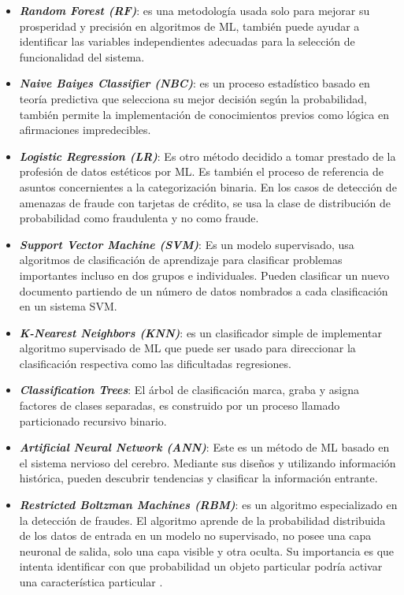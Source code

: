   \begin{itemize}
  	\item \textit{\textbf{Random Forest (RF)}}: es una metodolog\'{i}a usada solo para mejorar su prosperidad y precisi\'{o}n en algoritmos de ML, tambi\'{e}n puede ayudar a identificar las variables independientes adecuadas para la selecci\'{o}n de funcionalidad del sistema.
  	\item \textit{\textbf{Naive Baiyes Classifier (NBC)}}: es un proceso estad\'{i}stico basado en teor\'{i}a predictiva que selecciona su mejor decisi\'{o}n seg\'{u}n la probabilidad, tambi\'{e}n permite la implementaci\'{o}n de conocimientos previos como l\'{o}gica en afirmaciones impredecibles.
  	\item \textit{\textbf{Logistic Regression (LR)}}: Es otro m\'{e}todo decidido a tomar prestado de la profesi\'{o}n de datos est\'{e}ticos por ML. Es tambi\'{e}n el proceso de referencia de asuntos concernientes a la categorizaci\'{o}n binaria. En los casos de detecci\'{o}n de amenazas de fraude con tarjetas de cr\'{e}dito, se usa la clase de distribuci\'{o}n de probabilidad como fraudulenta y no como fraude.
  	\item \textit{\textbf{Support Vector Machine (SVM)}}: Es un modelo supervisado, usa algoritmos de clasificaci\'{o}n de aprendizaje para clasificar problemas importantes incluso en dos grupos e individuales. Pueden clasificar un nuevo documento partiendo de un n\'{u}mero de datos nombrados a cada clasificaci\'{o}n en un sistema SVM.
  	\item \textit{\textbf{K-Nearest Neighbors (KNN)}}: es un clasificador simple de implementar algoritmo supervisado de ML que puede ser usado para direccionar la clasificaci\'{o}n respectiva como las dificultadas regresiones.
  	\item \textit{\textbf{Classification Trees}}: El \'{a}rbol de clasificaci\'{o}n marca, graba y asigna factores de clases separadas, es construido por un proceso llamado particionado recursivo binario.
  	\item \textit{\textbf{Artificial Neural Network (ANN)}}: Este es un m\'{e}todo de ML basado en el sistema nervioso del cerebro. Mediante sus dise\~{n}os y utilizando informaci\'{o}n hist\'{o}rica, pueden descubrir tendencias y clasificar la informaci\'{o}n entrante.
  	\item \textit{\textbf{Restricted Boltzman Machines (RBM)}}: es un algoritmo especializado en la detecci\'{o}n de fraudes. El algoritmo aprende de la probabilidad distribuida de los datos de entrada en un modelo no supervisado, no posee una capa neuronal de salida, solo una capa visible y otra oculta. Su importancia es que intenta identificar con que probabilidad un objeto particular podr\'{i}a activar una caracter\'{i}stica particular \cite{5}.

\end{itemize}
